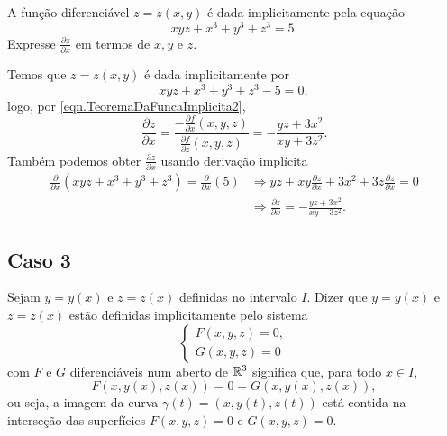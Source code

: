 \begin{example}
    A função diferenciável \(z = z(x,y)\) é dada implicitamente pela equação \[xyz + x^3 + y^3 + z^3 = 5.\] Expresse \(\frac{\partial z}{\partial x}\) em termos de \(x, y\) e \(z\).

    Temos que \(z = z(x,y)\) é dada implicitamente por \[ xyz + x^3 + y^3 + z^3 - 5 = 0, \] logo, por \eqref{eqn.TeoremaDaFuncaImplicita2}, \[\frac{\partial z}{\partial x} = \frac{- \frac{\partial f}{\partial x}(x,y,z)}{\frac{\partial f}{\partial z}(x,y,z)} = - \frac{yz+3x^2}{xy + 3z^2}.\] Também podemos obter \(\frac{\partial z}{\partial x}\) usando derivação implícita
        \begin{align*}
            \frac{\partial}{\partial x}(xyz + x^3 + y^3 + z^3) = \frac{\partial}{\partial x}(5) 
                & \Rightarrow yz + xy \frac{\partial z}{\partial x} + 3x^2 + 3z\frac{\partial z}{\partial x} = 0 \\
                & \Rightarrow \frac{\partial z}{\partial x} = - \frac{yz+3x^2}{xy + 3z^2}.
        \end{align*}
\end{example}

\subsection{Caso 3}
    Sejam \(y = y(x)\) e \(z = z(x)\) definidas no intervalo \(I\). Dizer que \(y = y(x)\) e \(z = z(x)\) estão definidas implicitamente pelo sistema
        \[\begin{cases}
            F(x,y,z) = 0,\\
            G(x,y,z) = 0
        \end{cases}\]
    com \(F\) e \(G\) diferenciáveis num aberto de \(\mathbb{R}^3\) significa que, para todo \(x\in I\), \[F(x,y(x),z(x)) = 0 = G(x,y(x),z(x)),\] ou seja, a imagem da curva \(\gamma(t) = (x,y(t),z(t))\) está contida na interseção das superfícies \(F(x,y,z) = 0\) e \(G(x,y,z) = 0\).

